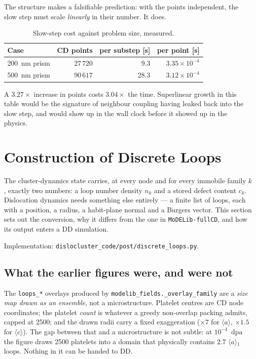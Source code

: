 \documentclass[11pt,a4paper]{article}
\newcommand{\code}[1]{\texttt{\small #1}}
\newcommand{\dpa}{\ensuremath{\mathrm{dpa}}}
\newcommand{\aloop}{\ensuremath{\langle a\rangle}}
\newcommand{\cloop}{\ensuremath{\langle c\rangle}}
\begin{document}
The structure makes a falsifiable prediction: with the points independent, the
slow step must scale \emph{linearly} in their number. It does.

\begin{table}[htb]
\centering
\caption{Slow-step cost against problem size, measured.}
\label{tab:slowscaling}
\begin{tabular}{lrrr}
\toprule
Case & CD points & per substep [s] & per point [s] \\
\midrule
200~nm prism & $27\,720$ & 9.3  & $3.35\times10^{-4}$ \\
500~nm prism & $90\,617$ & 28.3 & $3.12\times10^{-4}$ \\
\bottomrule
\end{tabular}
\end{table}

A $3.27\times$ increase in points costs $3.04\times$ the time. Superlinear
growth in this table would be the signature of neighbour coupling having leaked
back into the slow step, and would show up in the wall clock before it showed
up in the physics.

\section{Construction of Discrete Loops}

The cluster-dynamics state carries, at every node and for every immobile family
$k$, exactly two numbers: a loop number density $n_k$ and a stored defect
content $c_k$. Dislocation dynamics needs something else entirely --- a finite
list of loops, each with a position, a radius, a habit-plane normal and a
Burgers vector. This section sets out the conversion, why it differs from the
one in \code{MoDELib-fullCD}, and how its output enters a DD simulation.

Implementation: \code{dislocluster\_code/post/discrete\_loops.py}.

\subsection{What the earlier figures were, and were not}

The \code{loops\_*} overlays produced by
\code{modelib\_fields.\_overlay\_family} are a \emph{size map drawn as an
ensemble}, not a microstructure. Platelet centres are CD node coordinates; the
platelet \emph{count} is whatever a greedy non-overlap packing admits, capped at
2500; and the drawn radii carry a fixed exaggeration ($\times 7$ for \aloop,
$\times 1.5$ for \cloop). The gap between that and a microstructure is not
subtle: at $10^{-4}$~\dpa{} the figure draws 2500 platelets into a domain that
physically contains $2.7$ \aloop$_1$ loops. Nothing in it can be handed to DD.
\end{document}
